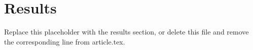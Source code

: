 \section{Results}
\label{sec:results}



Replace this placeholder with the results section, or delete this file
and remove the corresponding \verb|| line from article.tex.

